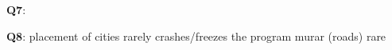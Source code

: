 \textbf{Q7}: \newline

\textbf{Q8}: \newline
placement of cities rarely crashes/freezes the program
murar (roads) rare


